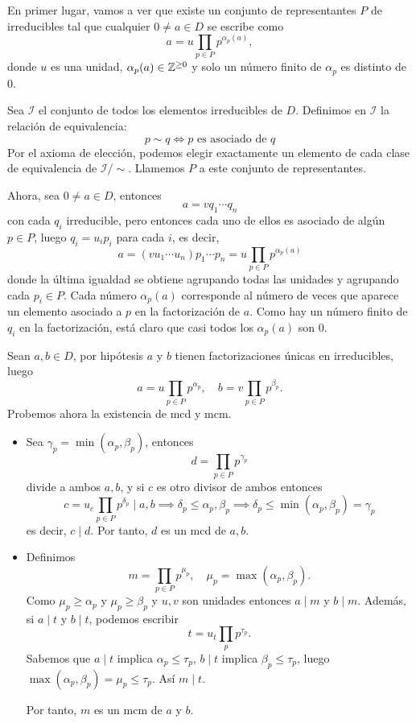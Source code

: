 \begin{proofbox}
En primer lugar, vamos a ver que existe un conjunto de representantes $P$ de irreducibles tal que cualquier $0 \neq a \in D$ se escribe como
\[
a = u \prod_{p \in P} p^{\alpha_p(a)},
\]
donde $u$ es una unidad, $\alpha_p(a) \in \mathbb{Z}^{\geq 0}$ y solo un número finito de $\alpha_p$ es distinto de 0.

Sea $\mathcal{I}$ el conjunto de todos los elementos irreducibles de $D$. Definimos en $\mathcal{I}$ la relación de equivalencia:
\[
p \sim q \iff \text{$p$ es asociado de $q$}
\]
Por el axioma de elección, podemos elegir exactamente un elemento de cada clase de equivalencia de $\mathcal{I}/\sim$. Llamemos $P$ a este conjunto de representantes.

Ahora, sea $0 \neq a \in D$, entonces
\[
a = v q_1 \cdots q_n
\]
con cada $q_i$ irreducible, pero entonces cada uno de ellos es asociado de algún $p \in P$, luego $q_i = u_i p_i$ para cada $i$, es decir,
\[
a = (v u_1 \cdots u_n) p_1 \cdots p_n = u \prod_{p \in P} p^{\alpha_p(a)}
\]
donde la última igualdad se obtiene agrupando todas las unidades y agrupando cada $p_i \in P$. Cada número $\alpha_p(a)$ corresponde al número de veces que aparece un elemento asociado a $p$ en la factorización de $a$. Como hay un número finito de $q_i$ en la factorización, está claro que casi todos los $\alpha_p(a)$ son 0.

Sean $a,b \in D$, por hipótesis $a$ y $b$ tienen factorizaciones únicas en irreducibles, luego
\[
a = u \prod_{p \in P} p^{\alpha_p},\quad b = v \prod_{p \in P} p^{\beta_p}.
\]
Probemos ahora la existencia de mcd y mcm.
\begin{itemize}
\item 
Sea $\gamma_p = \min(\alpha_p, \beta_p)$, entonces
\[
d = \prod_{p \in P} p^{\gamma_p}
\]
divide a ambos $a,b$, y si $c$ es otro divisor de ambos entonces
\[
c=u_c \prod_{p \in P} p^{\delta_p} \mid a,b \implies \delta_p \leq \alpha_p, \beta_p \implies \delta_p \leq \min(\alpha_p, \beta_p) = \gamma_p 
\]
es decir, $c \mid d$. Por tanto, $d$ es un mcd de $a,b$. 

\item Definimos
\[
m = \prod_{p \in P} p^{\mu_p}, \quad \mu_p = \max(\alpha_p, \beta_p).
\]
Como \( \mu_p \ge \alpha_p \) y \( \mu_p \ge \beta_p \) y $u,v$ son unidades entonces \( a \mid m \) y \( b \mid m \). Además, si \( a \mid t \) y \( b \mid t \), podemos escribir
\[
t = u_t \prod_p p^{\tau_p}.
\]  
Sabemos que \( a \mid t \) implica \( \alpha_p \le \tau_p \), \( b \mid t \) implica \( \beta_p \le \tau_p \), luego \( \max(\alpha_p, \beta_p) = \mu_p \le \tau_p \). Así \( m \mid t \).

Por tanto, \( m \) es un mcm de \( a \) y \( b \).

\end{itemize}
\end{proofbox}


